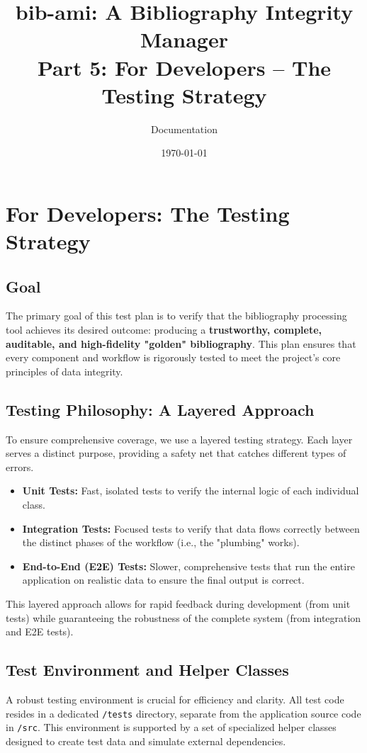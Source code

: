 \documentclass[11pt, a4paper]{article}
\title{\textbf{bib-ami}: A Bibliography Integrity Manager \\ \large Part 5: For Developers -- The Testing Strategy}
\author{Documentation}
\date{\today}
\begin{document}
\maketitle
\tableofcontents
\newpage

\section{For Developers: The Testing Strategy}

\subsection{Goal}
The primary goal of this test plan is to verify that the bibliography processing tool achieves its desired outcome: producing a \textbf{trustworthy, complete, auditable, and high-fidelity "golden" bibliography}. This plan ensures that every component and workflow is rigorously tested to meet the project’s core principles of data integrity.

\subsection{Testing Philosophy: A Layered Approach}
To ensure comprehensive coverage, we use a layered testing strategy. Each layer serves a distinct purpose, providing a safety net that catches different types of errors.
\begin{itemize}
    \item \textbf{Unit Tests:} Fast, isolated tests to verify the internal logic of each individual class.
    \item \textbf{Integration Tests:} Focused tests to verify that data flows correctly between the distinct phases of the workflow (i.e., the "plumbing" works).
    \item \textbf{End-to-End (E2E) Tests:} Slower, comprehensive tests that run the entire application on realistic data to ensure the final output is correct.
\end{itemize}
This layered approach allows for rapid feedback during development (from unit tests) while guaranteeing the robustness of the complete system (from integration and E2E tests).

\subsection{Test Environment and Helper Classes}
A robust testing environment is crucial for efficiency and clarity. All test code resides in a dedicated \texttt{/tests} directory, separate from the application source code in \texttt{/src}. This environment is supported by a set of specialized helper classes designed to create test data and simulate external dependencies.
\end{document}
